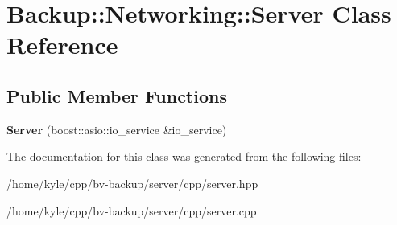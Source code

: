 \hypertarget{class_backup_1_1_networking_1_1_server}{}\section{Backup\+:\+:Networking\+:\+:Server Class Reference}
\label{class_backup_1_1_networking_1_1_server}
\subsection*{Public Member Functions}
\begin{DoxyCompactItemize}
\item 
\mbox{\label{class_backup_1_1_networking_1_1_server_ac9ad7c8bb7fe2f5da5101da1297c9ae1}} 
{\bfseries Server} (boost\+::asio\+::io\+\_\+service \&io\+\_\+service)
\end{DoxyCompactItemize}


The documentation for this class was generated from the following files\+:\begin{DoxyCompactItemize}
\item 
/home/kyle/cpp/bv-\/backup/server/cpp/server.\+hpp\item 
/home/kyle/cpp/bv-\/backup/server/cpp/server.\+cpp\end{DoxyCompactItemize}
